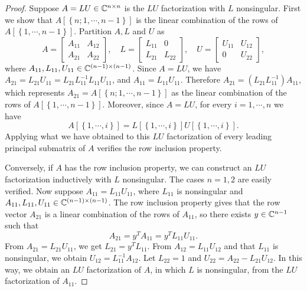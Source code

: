 \documentclass[12pt]{article}
\begin{document}
\begin{proof}
    Suppose \(A=LU\in\mathbb C^{n\times n}\) is the \(LU\) factorization with \(L\) nonsingular. First we show that \(A\left[\left\{n;1,\cdots,n-1\right\}\right]\) is the linear combination of the rows of \(A\left[\left\{1,\cdots,n-1\right\}\right]\). Partition \(A,L\) and \(U\) as
    \[A=\begin{bmatrix}
        A_{11} & A_{12}\\
        A_{21} & A_{22}
    \end{bmatrix},\quad L=\begin{bmatrix}
        L_{11} & 0\\
        L_{21} & L_{22}
    \end{bmatrix},\quad U=\begin{bmatrix}
        U_{11} & U_{12}\\
        0 & U_{22}
    \end{bmatrix},\]
    where \(A_{11},L_{11},U_{11}\in\mathbb C^{(n-1)\times(n-1)}\). Since \(A=LU\), we have \(A_{21}=L_{21}U_{11}=L_{21}L_{11}^{-1}L_{11}U_{11}\), and \(A_{11}=L_{11}U_{11}\). Therefore \(A_{21}=\left(L_{21}L_{11}^{-1}\right)A_{11}\), which represents \(A_{21}=A\left[\left\{n;1,\cdots,n-1\right\}\right]\) as the linear combination of the rows of \(A\left[\left\{1,\cdots,n-1\right\}\right]\). Moreover, since \(A=LU\), for every \(i=1,\cdots,n\) we have
    \[A\left[\left\{1,\cdots,i\right\}\right]=L\left[\left\{1,\cdots,i\right\}\right]U\left[\left\{1,\cdots,i\right\}\right].\]
    Applying what we have obtained to this \(LU\) factorization of every leading principal submatrix of \(A\) verifies the row inclusion property.\par
    Conversely, if \(A\) has the row inclusion property, we can construct an \(LU\) factorization inductively with \(L\) nonsingular. The cases \(n=1,2\) are easily verified. Now suppose \(A_{11}=L_{11}U_{11}\), where \(L_{11}\) is nonsingular and \(A_{11},L_{11},U_{11}\in\mathbb C^{(n-1)\times(n-1)}\). The row inclusion property gives that the row vector \(A_{21}\) is a linear combination of the rows of \(A_{11}\), so there exists \(y\in\mathbb C^{n-1}\) such that
    \[A_{21}=y^TA_{11}=y^TL_{11}U_{11}.\]
    From \(A_{21}=L_{21}U_{11}\), we get \(L_{21}=y^TL_{11}\). From \(A_{12}=L_{11}U_{12}\) and that \(L_{11}\) is nonsingular, we obtain \(U_{12}=L_{11}^{-1}A_{12}\). Let \(L_{22}=1\) and \(U_{22}=A_{22}-L_{21}U_{12}\). In this way, we obtain an \(LU\) factorization of \(A\), in which \(L\) is nonsingular, from the \(LU\) factorization of \(A_{11}\).
\end{proof}
\end{document}
